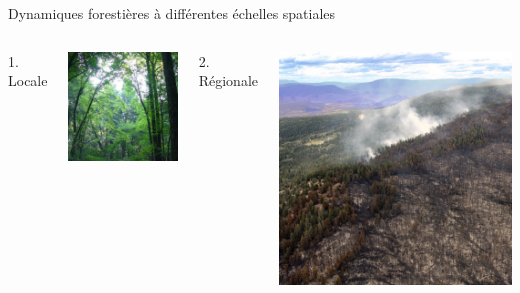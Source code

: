 \documentclass[11pt, compress, aspectratio=1610]{beamer}
\begin{document}
\begin{frame}{Dynamiques forestières à différentes échelles spatiales}

\begin{columns}[T]
  \column{6.5cm}
    1. Locale

    \centering
      \includegraphics[scale=0.338]{figures/gap}\par
  \column{6.5cm}
    2. Régionale

    \centering
      \includegraphics[scale=0.08]{figures/fire}\par
\end{columns}

\end{frame}
\end{document}
